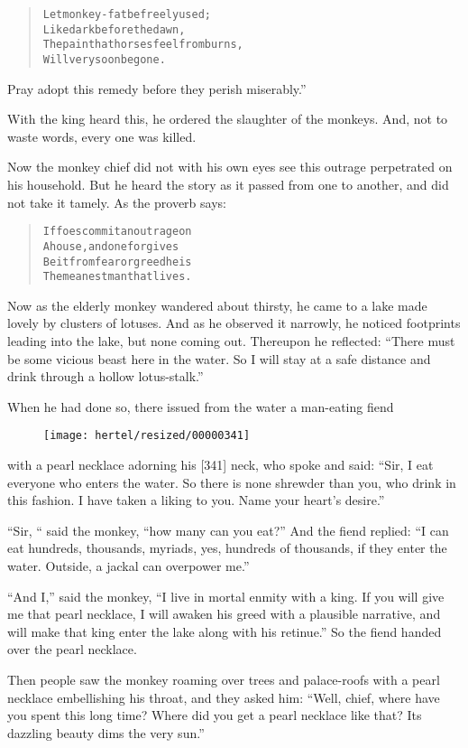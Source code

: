 \documentclass[article, twoside, 10pt]{memoir}
\renewenvironment{verbatim}{%
\begin{quote}%
\vskip -10pt%
\begin{alltt}\normalfont\small}{\end{alltt}%
\end{quote}%
\vskip -10pt
} %
\begin{document}
\begin{verbatim}
Let monkey-fat be freely used;
    Like dark before the dawn,
The pain that horses feel from burns,
    Will very soon be gone.
\end{verbatim}
Pray adopt this remedy before they perish miserably.”

With the king heard this, he ordered the slaughter of the monkeys.
And, not to waste words, every one was killed.

Now the monkey chief did not with his own eyes see this outrage
perpetrated on his household. But he heard the story as it passed
from one to another, and did not take it tamely. As the proverb
says:

\begin{verbatim}
If foes commit an outrage on
    A house, and one forgives{\textemdash}
Be it from fear or greed{\textemdash}he is
    The meanest man that lives.
\end{verbatim}
Now as the elderly monkey wandered about thirsty, he came to a lake
made lovely by clusters of lotuses. And as he observed it narrowly,
he noticed footprints leading into the lake, but none coming out.
Thereupon he reflected:
``There must be some vicious beast here in the water. So I will stay at a safe distance and drink through a hollow lotus-stalk.''

When he had done so, there issued from the water a man-eating fiend
\begin{figure}[p]\texttt{[image: hertel/resized/00000341]}\end{figure}with a pearl necklace adorning his [341] neck, who spoke and said:
``Sir, I eat everyone who enters the water. So there is none shrewder than you, who drink in this fashion. I have taken a liking to you. Name your heart's desire.''

``Sir, “ said the monkey, “how many can you eat?'' And the fiend
replied:
``I can eat hundreds, thousands, myriads, yes, hundreds of thousands, if they enter the water. Outside, a jackal can overpower me.''

``And I,'' said the monkey,
``I live in mortal enmity with a king. If you will give me that pearl necklace, I will awaken his greed with a plausible narrative, and will make that king enter the lake along with his retinue.''
So the fiend handed over the pearl necklace.

Then people saw the monkey roaming over trees and palace-roofs with
a pearl necklace embellishing his throat, and they asked him:
``Well, chief, where have you spent this long time? Where did you get a pearl necklace like that? Its dazzling beauty dims the very sun.''
\end{document}
